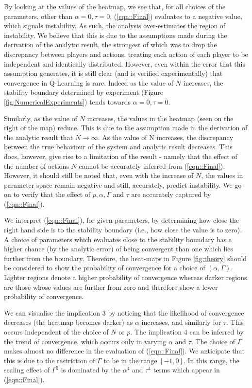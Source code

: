 \documentclass[sigconf,anonymous]{aamas}
\begin{document}
By looking at the values of the heatmap, we see that, for all choices
of the parameters, other than $\alpha = 0, \tau = 0$,
(\ref{eqn::Final}) evaluates to a negative value, which signals
instability. As such, the analysis over-estimates the region of
instability. We believe that this is due to the
assumptions made during the derivation of the analytic result, the
strongest of which was to drop the discrepancy between players and
actions, treating each action of each player to be independent and
identically distributed. However, even within the error that this
assumption generates, it is still clear (and is verified
experimentally) that convergence in Q-Learning is rare. Indeed as the
value of $N$ increases, the stability boundary determined by
experiment (Figure \ref{fig:NumericalExperiments}) tends towards
$\alpha = 0, \tau = 0$.

Similarly, as the value of $N$ increases, the values in the heatmap
(seen on the right of the map) reduce. This is due to the assumption
made in the derivation of the analytic result that $N \rightarrow
\infty$. As the value of N increases, the discrepancy between the true
behaviour of the system and analytic result decreases. This does,
however, give rise to a limitation of the result - namely that the
effect of the number of actions $N$ cannot be accurately inferred from
 (\ref{eqn::Final}). However, it should still be noted that, even
with the increase of $N$, the values in parameter space remain negative
and still, accurately, predict instability. We go on to verify that
the effect of $p, \alpha, \Gamma$ and $\tau$ are accurately captured
by (\ref{eqn::Final}).

We interpret (\ref{eqn::Final}), for given parameters, by determining how close the right hand side is to the stability boundary (i.e., how close the value is to zero). A choice of parameters which evaluates close to the stability boundary has a higher chance (by the analytic error) of being convergent than one which lies further from the boundary. Therefore, the heat-maps in Figure \ref{fig:theory} should be considered to show the probability of convergence for a choice of $(\alpha, \Gamma)$. Lighter regions denote a higher probability of convergence whereas darker regions are those whose values are further from zero and therefore show a lower probability of convergence.

We can visualise the implication 3 by noticing that the likelihood of convergence decreases (the heatmap becomes darker) as $\alpha$ increases, and similarly for $\tau$. This occurs independent of the choice of $N$ or $p$. The implication 4 can be inferred by the trend of convergence, which occurs only in varying $\alpha$ and $\tau$. The choice of $\Gamma$
makes almost no difference in the evaluation of (\ref{eqn::Final}). We anticipate that this is due to the restriction of $\Gamma$ to be in the range $[-1, 0]$. In this range, the scaling effect of $\Gamma^2$ is dominated by the $\alpha^4$ and $\tau^4$ terms which appear in (\ref{eqn::Final}).
\end{document}
